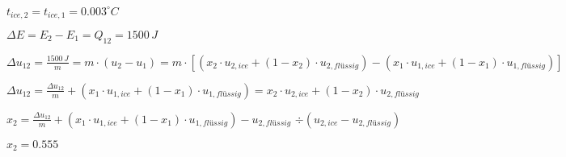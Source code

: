 \( t_{ice,2} = t_{ice,1} = 0.003^\circ C \)  

\( \Delta E = E_2 - E_1 = Q_{12} = 1500 \, J \)  

\( \Delta u_{12} = \frac{1500 \, J}{m} = m \cdot (u_2 - u_1) = m \cdot \left[ (x_2 \cdot u_{2,ice} + (1 - x_2) \cdot u_{2,flüssig}) - (x_1 \cdot u_{1,ice} + (1 - x_1) \cdot u_{1,flüssig}) \right] \)  

\( \Delta u_{12} = \frac{\Delta u_{12}}{m} + (x_1 \cdot u_{1,ice} + (1 - x_1) \cdot u_{1,flüssig}) = x_2 \cdot u_{2,ice} + (1 - x_2) \cdot u_{2,flüssig} \)  

\( x_2 = \frac{\Delta u_{12}}{m} + (x_1 \cdot u_{1,ice} + (1 - x_1) \cdot u_{1,flüssig}) - u_{2,flüssig} \)  
\( \div (u_{2,ice} - u_{2,flüssig}) \)  

\( x_2 = 0.555 \)